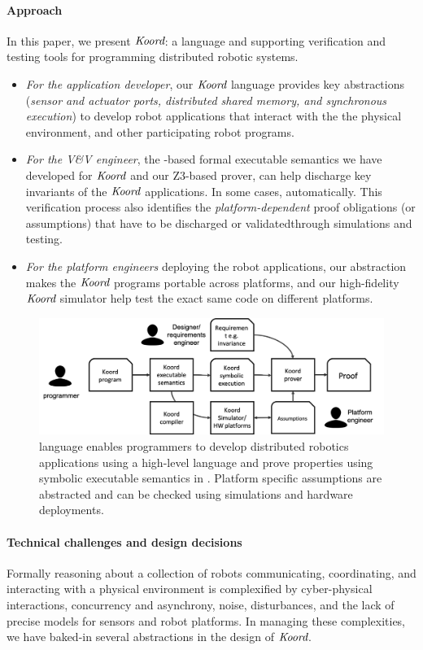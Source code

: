 \paragraph{Approach} In this paper, we present $\emph{Koord}$: a language and supporting verification and testing tools for programming distributed robotic systems. 
\begin{itemize}
\item {\em For the application developer}, our $\emph{Koord}$ language provides key abstractions (\emph{sensor and actuator ports, distributed shared memory, and synchronous execution}) to develop robot applications that interact with the the physical environment, and other participating robot programs.
\item {\em For the V\&V engineer}, the \K-based formal executable semantics we have developed for $\emph{Koord}$ and our Z3-based prover, can help discharge key invariants of the $\emph{Koord}$ applications.  In some cases,  automatically. This verification process also identifies the {\em platform-dependent\/} proof obligations (or assumptions) that have to be discharged or validatedthrough simulations and testing. 
\item {\em For the platform engineers\/} deploying the robot applications, our abstraction makes the $\emph{Koord}$ programs portable across platforms, and our high-fidelity $\emph{Koord}$ simulator help test the exact same code on different platforms.
\end{itemize}

\begin{figure}[h!]
\includegraphics[width=\linewidth]{figs/koorduser.png}
\caption{\small \lgname language  enables programmers to develop distributed robotics applications using a high-level language and prove properties using symbolic executable semantics in \K. Platform specific assumptions are abstracted and can be checked using simulations and hardware deployments.}
\label{fig:koorduser}	
\end{figure}

\paragraph{Technical challenges and design decisions}
Formally reasoning about a collection of robots communicating, coordinating, and interacting with a physical environment is complexified by  cyber-physical interactions, concurrency and asynchrony, noise, disturbances, and the lack of precise models for sensors and robot platforms.
%
In managing these complexities, we have baked-in several abstractions in the design of $\emph{Koord}$.
%

